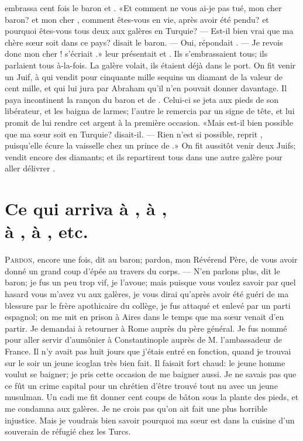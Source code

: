  embrassa cent fois le baron et . «Et comment ne vous
ai-je pas tué, mon cher baron? et mon cher , comment êtes-vous
en vie, après avoir été pendu? et pourquoi êtes-vous tous deux aux
galères en Turquie? — Est-il bien vrai que ma chère sœur soit dans ce
pays? disait le baron. — Oui, répondait . — Je revois donc mon cher
! s’écriait .»  leur présentait  et .
Ils s’embrassaient tous; ils parlaient tous à-la-fois. La galère
volait, ils étaient déjà dans le port. On fit venir un Juif, à qui
 vendit pour cinquante mille sequins un diamant de la valeur de
cent mille, et qui lui jura par Abraham qu’il n’en pouvait donner
davantage. Il paya incontinent la rançon du baron et de .
Celui-ci se jeta aux pieds de son libérateur, et les baigna de larmes;
l’autre le remercia par un signe de tête, et lui promit de lui rendre
cet argent à la première occasion. «Mais est-il bien possible que ma
sœur soit en Turquie? disait-il. — Rien n’est si possible, reprit
, puisqu’elle écure la vaisselle chez un prince de .»
On fit aussitôt venir deux Juifs;  vendit encore des diamants;
et ils repartirent tous dans une autre galère pour aller délivrer
.


\chapter[Ce qui arriva à Candide, à Cunégonde…]{Ce qui arriva à , à ,\\à , à , etc.}


\lettrine[findent=1pt,ante=«]{P}{ardon}, encore une fois, dit  au baron; pardon, mon Révérend
Père, de vous avoir donné un grand coup d’épée au travers du corps.
— N’en parlons plus, dit le baron; je fus un peu trop vif, je l’avoue;
mais puisque vous voulez savoir par quel hasard vous m’avez vu aux
galères, je vous dirai qu’après avoir été guéri de ma blessure par le
frère apothicaire du collège, je fus attaqué et enlevé par un parti
espagnol; on me mit en prison à  Aires dans le temps que ma sœur
venait d’en partir. Je demandai à retourner à Rome auprès du père
général. Je fus nommé pour aller servir d’aumônier à Constantinople
auprès de M. l’ambassadeur de France. Il n’y avait pas huit jours
que j’étais entré en fonction, quand je trouvai sur le soir un jeune
icoglan très bien fait. Il faisait fort chaud: le jeune homme voulut se
baigner; je pris cette occasion de me baigner aussi. Je ne savais pas
que ce fût un crime capital pour un chrétien d’être trouvé tout nu avec
un jeune musulman. Un cadi me fit donner cent coups de bâton sous la
plante des pieds, et me condamna aux galères. Je ne crois pas qu’on ait
fait une plus horrible injustice. Mais je voudrais bien savoir pourquoi
ma sœur est dans la cuisine d’un souverain de  réfugié
chez les Turcs.


